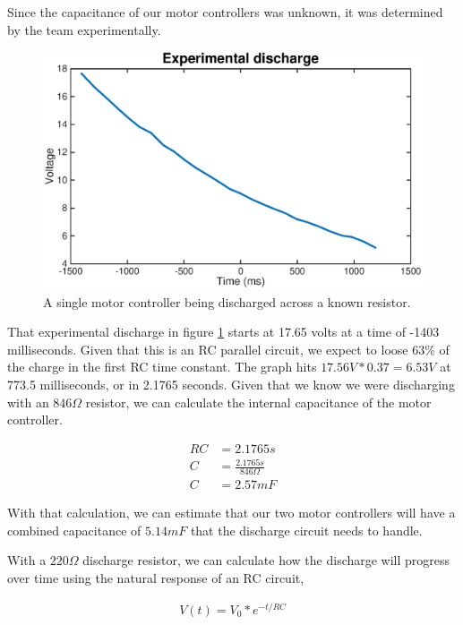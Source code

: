\documentclass{article}
\begin{document}
            Since the capacitance of our motor controllers was unknown, it was determined by the team experimentally.  
            
            \begin{figure}[H]
                \centering
                \includegraphics[width = 0.8  \textwidth]{experimental_discharge.eps}
                \caption{A single motor controller being discharged across a known resistor.}
                \label{discharge}
            \end{figure}
            
            That experimental discharge in figure \ref{discharge} starts at 17.65 volts at a time of -1403 milliseconds. Given that this is an RC parallel circuit, we expect to loose 63\% of the charge in the first RC time constant. The graph hits $17.56 V * 0.37 = 6.53 V$ at 773.5 milliseconds, or in 2.1765 seconds. Given that we know we were discharging with an $846 \Omega$ resistor, we can calculate the internal capacitance of the motor controller.
            
            \begin{align}
                RC &= 2.1765 s\\
                C &= \frac{2.1765 s}{846 \Omega}\\
                C &= 2.57 mF
            \end{align}
            
            With that calculation, we can estimate that our two motor controllers will have a combined capacitance of $5.14 mF$ that the discharge circuit needs to handle. 
            
            With a $220 \Omega$ discharge resistor, we can calculate how the discharge will progress over time using the natural response of an RC circuit, 
            
            \begin{align}
                V(t) = V_{0} * e^{-t/RC}
            \end{align}
            
\end{document}
